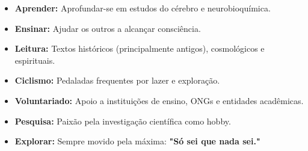 
\begin{itemize}
    \item \textbf{Aprender:} Aprofundar-se em estudos do cérebro e neurobioquímica.
    \item \textbf{Ensinar:} Ajudar os outros a alcançar consciência.
    \item \textbf{Leitura:} Textos históricos (principalmente antigos), cosmológicos e espirituais.
    \item \textbf{Ciclismo:} Pedaladas frequentes por lazer e exploração.
    \item \textbf{Voluntariado:} Apoio a instituições de ensino, ONGs e entidades acadêmicas.
    \item \textbf{Pesquisa:} Paixão pela investigação científica como hobby.
    \item \textbf{Explorar:} Sempre movido pela máxima: \textbf{"Só sei que nada sei."}
\end{itemize}
